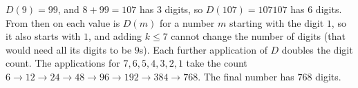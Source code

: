 $D(9)=99$, and $8+99=107$ has $3$ digits, so $D(107)=107107$ has $6$ digits. From then on each value is $D(m)$ for a number $m$ starting with the digit $1$, so it also starts with $1$, and adding $k\le7$ cannot change the number of digits (that would need all its digits to be $9$s). Each further application of $D$ doubles the digit count. The applications for $7,6,5,4,3,2,1$ take the count $6\to12\to24\to48\to96\to192\to384\to768$. The final number has $\boxed{768}$ digits.
